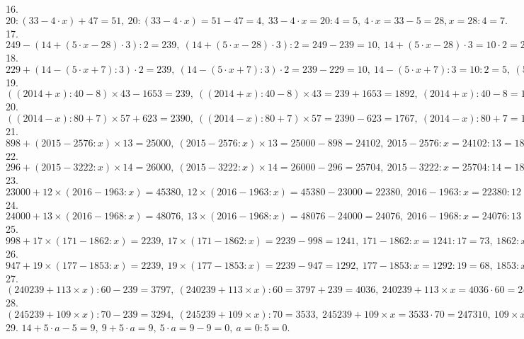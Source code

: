 16. $20:(33-4\cdot x)+47=51,\ 20:(33-4\cdot x)=51-47=4,\ 33-4\cdot x=20:4=5,\ 4\cdot x=33-5=28, x=28:4=7.$\\
17. $249-(14+(5\cdot x-28)\cdot 3):2=239,\ (14+(5\cdot x-28)\cdot 3):2=249-239=10,\ 14+(5\cdot x-28)\cdot 3=10\cdot2=20,\ (5\cdot x-28)\cdot 3=20-14=6,\
5\cdot x-28=6:3=2,\ 5\cdot x=2+28=30,\ x=30:5=6.$\\
18. $229+(14-(5\cdot x+7):3)\cdot2=239,\ (14-(5\cdot x+7):3)\cdot2=239-229=10,\ 14-(5\cdot x+7):3=10:2=5,\ (5\cdot x+7):3=14-5=9,\ 5\cdot x+7=9\cdot3=27,\
5\cdot x=27-7=20,\ x=20:5=4.$\\
19. $((2014+x):40-8)\times43-1653=239,\ ((2014+x):40-8)\times43=239+1653=1892,\ (2014+x):40-8=1892:43=44,\ (2014+x):40=44+8=52,\ 2014+x=52\cdot 40=2080,\
x=2080-2014=66.$\\
20. $((2014-x):80+7)\times57+623=2390,\ ((2014-x):80+7)\times57=2390-623=1767,\ (2014-x):80+7=1767:57=31,\ (2014-x):80=31-7=24,\ 2014-x=24\cdot80=1920, x=2014-1920=94.$\\
21. $898+(2015-2576:x)\times 13=25000,\ (2015-2576:x)\times 13=25000-898=24102,\ 2015-2576:x=24102:13=1854,\ 2576:x=2015-1854=161,\ x=2576:161=16.$\\
22. $296+(2015-3222:x)\times 14=26000,\ (2015-3222:x)\times 14=26000-296=25704,\ 2015-3222:x=25704:14=1836,\ 3222:x=2015-1836-179,\ x=3222:179=18.$\\
23. $23000+12\times (2016-1963:x)=45380,\ 12\times (2016-1963:x)=45380-23000=22380,\ 2016-1963:x=22380:12=1865,\ 1963:x=2016-1865=151,\ x=1963:151=13.$\\
24. $24000+13\times(2016-1968:x)=48076,\ 13\times(2016-1968:x)=48076-24000=24076,\ 2016-1968:x=24076:13=1852,\ 1968:x=2016-1852=164,\ x=1968:164=12.$\\
25. $998+17\times(171-1862:x)=2239,\ 17\times(171-1862:x)=2239-998=1241,\ 171-1862:x=1241:17=73,\ 1862:x=171-73=98,\ x=1862:98=19.$\\
26. $947+19\times(177-1853:x)=2239,\ 19\times(177-1853:x)=2239-947=1292,\ 177-1853:x=1292:19=68,\ 1853:x=177-68=109,\ x=1853:109=17.$\\
27. $(240239+113\times x):60-239=3797,\ (240239+113\times x):60=3797+239=4036,\ 240239+113\times x=4036\cdot60=242160,\ 113\times x=242160-240239=1921,\ x=1921:113=17.$\\
28. $(245239+109\times x):70-239=3294,\ (245239+109\times x):70=3533,\ 245239+109\times x=3533\cdot70=247310,\ 109\times x=2071,\ x=2071:109=19.$\\
29. $14+5\cdot a-5=9,\ 9+5\cdot a=9,\ 5\cdot a=9-9=0,\ a=0:5=0.$\\
